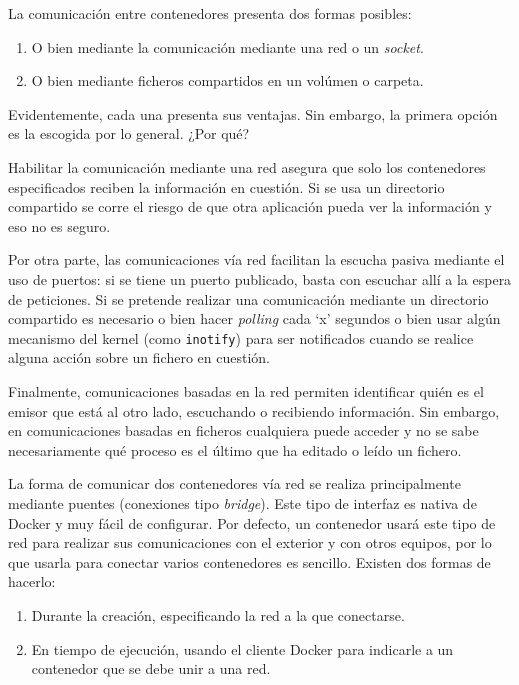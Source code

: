 La comunicación entre contenedores presenta dos formas posibles:

\begin{enumerate}
    \item O bien mediante la comunicación mediante una red o un \textit{socket}.
    \item O bien mediante ficheros compartidos en un volúmen o carpeta.
\end{enumerate}

Evidentemente, cada una presenta sus ventajas. Sin embargo, la primera opción es la
escogida por lo general. ¿Por qué?

Habilitar la comunicación mediante una red asegura que solo los contenedores
especificados reciben la información en cuestión. Si se usa un directorio compartido
se corre el riesgo de que otra aplicación pueda ver la información y eso no es seguro.

Por otra parte, las comunicaciones vía red facilitan la escucha pasiva mediante el
uso de puertos: si se tiene un puerto publicado, basta con escuchar allí a la
espera de peticiones. Si se pretende realizar una comunicación mediante un
directorio compartido es necesario o bien hacer \textit{polling} cada `x' segundos
o bien usar algún mecanismo del kernel (como \texttt{inotify}) para ser notificados
cuando se realice alguna acción sobre un fichero en cuestión.

Finalmente, comunicaciones basadas en la red permiten identificar quién es el
emisor que está al otro lado, escuchando o recibiendo información. Sin embargo, en
comunicaciones basadas en ficheros cualquiera puede acceder y no se sabe necesariamente
qué proceso es el último que ha editado o leído un fichero.

La forma de comunicar dos contenedores vía red se realiza principalmente mediante
puentes (conexiones tipo \textit{bridge}). Este tipo de interfaz es nativa de Docker
y muy fácil de configurar. Por defecto, un contenedor usará este tipo de red para
realizar sus comunicaciones con el exterior y con otros equipos, por lo que
usarla para conectar varios contenedores es sencillo. Existen dos formas de hacerlo:

\begin{enumerate}
    \item Durante la creación, especificando la red a la que conectarse.
    \item En tiempo de ejecución, usando el cliente Docker para indicarle a un
          contenedor que se debe unir a una red.
\end{enumerate}

